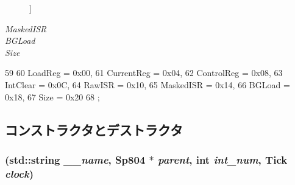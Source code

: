 \begin{Desc}
\begin{description}
{}]\item[{\em 
\hypertarget{classSp804_1_1Timer_a84627a72058502328269676b81780f89a84e908ced233cc8a35eabafa2c2acf93}{
MaskedISR}
\label{classSp804_1_1Timer_a84627a72058502328269676b81780f89a84e908ced233cc8a35eabafa2c2acf93}
}]\item[{\em 
\hypertarget{classSp804_1_1Timer_a84627a72058502328269676b81780f89a880658e75f8f318562e66aca33089115}{
BGLoad}
\label{classSp804_1_1Timer_a84627a72058502328269676b81780f89a880658e75f8f318562e66aca33089115}
}]\item[{\em 
\hypertarget{classSp804_1_1Timer_a84627a72058502328269676b81780f89aff9abf2b1a689f70a77a18da50c01d9f}{
Size}
\label{classSp804_1_1Timer_a84627a72058502328269676b81780f89aff9abf2b1a689f70a77a18da50c01d9f}
}]\end{description}
\end{Desc}




\begin{DoxyCode}
59              {
60             LoadReg    = 0x00,
61             CurrentReg = 0x04,
62             ControlReg = 0x08,
63             IntClear   = 0x0C,
64             RawISR     = 0x10,
65             MaskedISR  = 0x14,
66             BGLoad     = 0x18,
67             Size       = 0x20
68         };
\end{DoxyCode}


\subsection{コンストラクタとデストラクタ}
\hypertarget{classSp804_1_1Timer_a1ac56319b87382938cc537cd1e58717e}{
\subsubsection[{Timer}]{ (std::string {\em \_\-\_\-name}, \/  {\bf Sp804} $\ast$ {\em parent}, \/  int {\em int\_\-num}, \/  {\bf Tick} {\em clock})}}
\label{classSp804_1_1Timer_a1ac56319b87382938cc537cd1e58717e}



